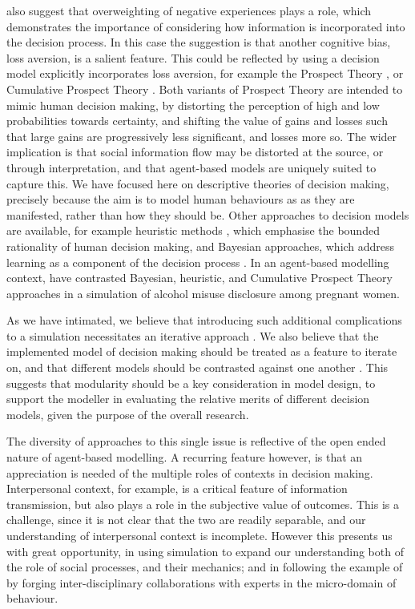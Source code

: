 \documentclass{article}
\begin{document}
\citeauthor{McKenzie2013} also suggest that overweighting of negative experiences plays a role, which demonstrates the importance of considering how information is incorporated into the decision process. In this case the suggestion is that another cognitive bias, loss aversion, is a salient feature. This could be reflected by using a decision model explicitly incorporates loss aversion, for example the Prospect Theory \citep{Kahneman1979}, or Cumulative Prospect Theory \citep{Tversky1992}. Both variants of Prospect Theory are intended to mimic human decision making, by distorting the perception of high and low probabilities towards certainty, and shifting the value of gains and losses such that large gains are progressively less significant, and losses more so. 
The wider implication is that social information flow may be distorted at the source, or through interpretation, and that agent-based models are uniquely suited to capture this.  We have focused here on descriptive theories of decision making, precisely because the aim is to model human behaviours as as they are manifested, rather than how they should be. Other approaches to decision models are available, for example heuristic methods \citep{Gigerenzer1996}, which emphasise the bounded rationality of human decision making, and Bayesian approaches, which address learning as a component of the decision process \citep{Robbins1964}. In an agent-based modelling context, \citet{Gray2016} have contrasted Bayesian, heuristic, and Cumulative Prospect Theory approaches in a simulation of alcohol misuse disclosure among pregnant women.

As we have intimated, we believe that introducing such additional complications to a simulation necessitates an iterative approach \citep{Cioffi-Revilla2010}. We also believe that the implemented model of decision making should be treated as a feature to iterate on, and that different models should be contrasted against one another \citep{Rossiter2014}. This suggests that modularity should be a key consideration in model design, to support the modeller in evaluating the relative merits of different decision models, given the purpose of the overall research.

The diversity of approaches to this single issue is reflective of the open ended nature of agent-based modelling. A recurring feature however, is that an appreciation is needed of the multiple roles of contexts in decision making. Interpersonal context, for example, is a critical feature of information transmission, but also plays a role in the subjective value of outcomes. This is a challenge, since it is not clear that the two are readily separable, and our understanding of interpersonal context is incomplete.
However this presents us with great opportunity, in using simulation to expand our understanding both of the role of social processes, and their mechanics; and in following the example of \citeauthor{Tversky1992} by forging inter-disciplinary collaborations with experts in the micro-domain of behaviour.
\end{document}
